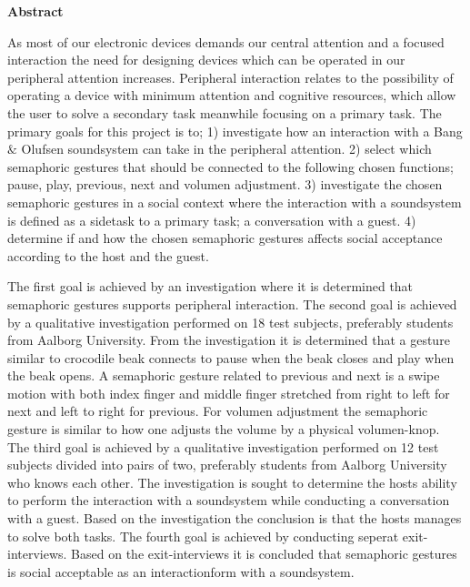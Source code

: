 \begin{center}
	\textbf{{\huge Abstract}}
\end{center}
%
As most of our electronic devices demands our central attention and a focused interaction the need for designing devices which can be operated in our peripheral attention increases. Peripheral interaction relates to the possibility of operating a device with minimum attention and cognitive resources, which allow the user to solve a secondary task meanwhile focusing on a primary task. The primary goals for this project is to; 1) investigate how an interaction with a Bang $\&$ Olufsen soundsystem can take in the peripheral attention. 2) select which semaphoric gestures that should be connected to the following chosen functions; pause, play, previous, next and volumen adjustment. 3) investigate the chosen semaphoric gestures in a social context where the interaction with a soundsystem is defined as a sidetask to a primary task; a conversation with a guest. 4) determine if and how the chosen semaphoric gestures affects social acceptance according to the host and the guest.            

The first goal is achieved by an investigation where it is determined that semaphoric gestures supports peripheral interaction. The second goal is achieved by a qualitative investigation performed on 18 test subjects, preferably students from Aalborg University. From the investigation it is determined that a gesture similar to crocodile beak connects to pause when the beak closes and play when the beak opens. A semaphoric gesture related to previous and next is a swipe motion with both index finger and middle finger stretched from right to left for next and left to right for previous. For volumen adjustment the semaphoric gesture is similar to how one adjusts the volume by a physical volumen-knop. The third goal is achieved by a qualitative investigation performed on 12 test subjects divided into pairs of two, preferably students from Aalborg University who knows each other. The investigation is sought to determine the hosts ability to perform the interaction with a soundsystem while conducting a conversation with a guest. Based on the investigation the conclusion is that the hosts manages to solve both tasks. The fourth goal is achieved by conducting seperat exit-interviews. Based on the exit-interviews it is concluded that semaphoric gestures is social acceptable as an interactionform with a soundsystem.